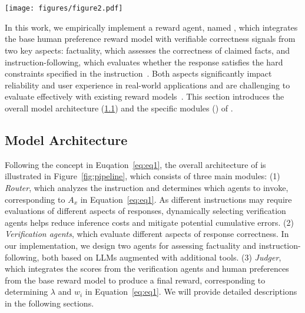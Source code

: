 \section{\ourmethod}
\label{sec:method}

\begin{figure*}[t]
    \centering
    \texttt{[image: figures/figure2.pdf]} %
    \caption{The framework of \ourmethod, including three modules: Router, Verification Agents, and Judger.
    }
    \label{fig:pipeline}
\end{figure*}


In this work, we empirically implement a reward agent, named \ourmethod, which integrates the base human preference reward model with verifiable correctness signals from two key aspects: factuality, which assesses the correctness of claimed facts, and instruction-following, which evaluates whether the response satisfies the hard constraints specified in the instruction~\citep{zhou2023instruction}. 
Both aspects significantly impact reliability and user experience in real-world applications and are challenging to evaluate effectively with existing reward models~\citep{liu2024rm}.
This section introduces the overall model architecture (\cref{sec:model_archi}) and the specific modules () of \ourmethod.


\subsection{Model Architecture}
\label{sec:model_archi}
Following the concept in Euqation~\ref{eq:eq1}, the overall architecture of \ourmethod is illustrated in Figure~\ref{fig:pipeline}, which consists of three main modules: (1) \textit{Router}, which analyzes the instruction and determines which agents to invoke, corresponding to $A_x$ in Equation~\ref{eq:eq1}. As different instructions may require evaluations of different aspects of responses, dynamically selecting verification agents helps reduce inference costs and mitigate potential cumulative errors.
(2) \textit{Verification agents}, which evaluate different aspects of response correctness. In our implementation, we design two agents for assessing factuality and instruction-following, both based on LLMs augmented with additional tools. 
(3) \textit{Judger}, which integrates the scores from the verification agents and human preferences from the base reward model to produce a final reward, corresponding to determining $\lambda$ and $w_i$ in Equation~\ref{eq:eq1}.
We will provide detailed descriptions in the following sections.


